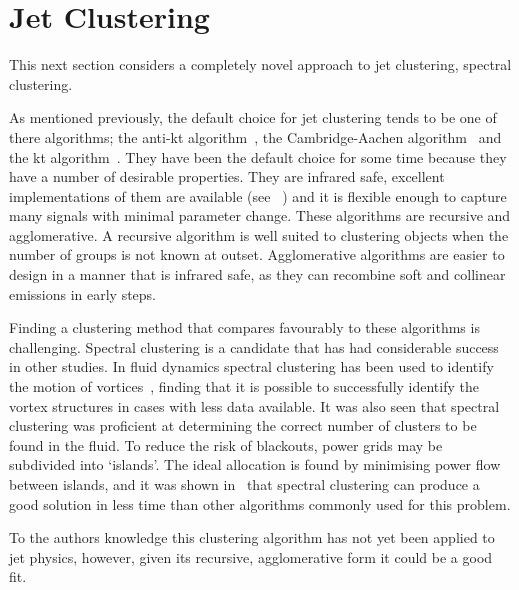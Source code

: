 \section{Jet Clustering}\label{sec:JetClustering}
This next section considers a completely novel approach to jet clustering, spectral clustering.

As mentioned previously, the default choice for jet clustering tends to be one of there algorithms;
the anti-kt algorithm~\cite{Cacciari2008akt}, the Cambridge-Aachen algorithm~\cite{Wobisch1998caJet} and the kt algorithm~\cite{Ellis1993ktJet}.
They have been the default choice for some time because they have a number of desirable properties.
They are infrared safe, excellent implementations of them are available (see \fastjet{}~\cite{Cacciari2011FastJet})
and it is flexible enough to capture many signals with minimal parameter change.
These algorithms are recursive and agglomerative.
A recursive algorithm is well suited to clustering objects when the number of groups is not known at outset.
Agglomerative algorithms are easier to design in a manner that is infrared safe,
as they can recombine soft and collinear emissions in early steps.

Finding a clustering method that compares favourably to these algorithms is challenging.
Spectral clustering is a candidate that has had considerable success in other studies.
In fluid dynamics spectral clustering has been used to identify the motion
of vortices~\cite{hadjighasem2016votex}, finding that it is possible
to successfully identify the vortex structures in cases with less data available.
It was also seen that spectral clustering was proficient at determining the correct number
of clusters to be found in the fluid.
To reduce the risk of blackouts, power grids may be subdivided into `islands'.
The ideal allocation is found by minimising power flow between islands,
and it was shown in~\cite{fennelly2014power} that spectral clustering
can produce a good solution in less time than other algorithms commonly used for this problem.


To the authors knowledge this clustering algorithm has not yet been applied to jet physics, %
however, given its recursive, agglomerative form it could be a good fit.
